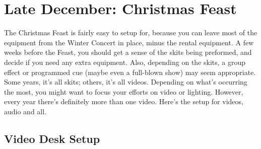 \documentclass[letterpaper,10pt,oneside,headsepline]{scrreprt}
\begin{document}
\section{Late December: Christmas Feast}
The Christmas Feast is fairly easy to setup for, because you can leave most of the equipment from the Winter Concert in place, minus the rental equipment. A few weeks before the Feast, you should get a sense of the skits being preformed, and decide if you need any extra equipment. Also, depending on the skits, a group effect or programmed cue (maybe even a full-blown show) may seem appropriate. Some years, it's all skits; others, it's all videos. Depending on what's occurring the most, you might want to focus your efforts on video or lighting. However, every year there's definitely more than one video. Here's the setup for videos, audio and all.

\subsection{Video Desk Setup}
\end{document}
